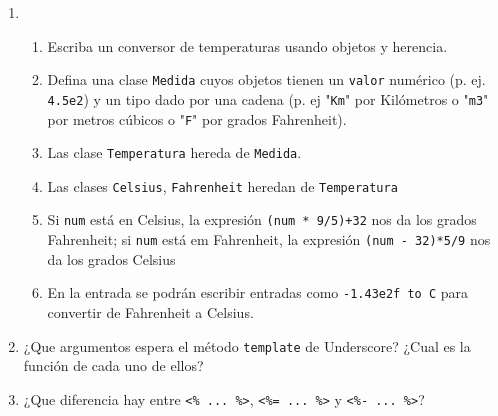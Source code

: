 \documentclass[spanish,a4paper,11pt]{article}
\begin{document}
\begin{enumerate}



\item 
\begin{enumerate}
\item  Escriba un conversor de temperaturas
usando objetos y herencia.
\item  Defina una clase \verb|Medida| cuyos objetos tienen un \verb|valor| numérico (p.  ej. \verb|4.5e2|) y un tipo dado por una cadena (p. ej "\verb|Km|" por Kilómetros o "\verb|m3|" por metros cúbicos o "\verb|F|" por grados Fahrenheit).

\item  Las clase \verb|Temperatura| hereda de \verb|Medida|.
\item  Las clases \verb|Celsius|, \verb|Fahrenheit| heredan de \verb|Temperatura|
\item 
Si \verb|num| está en Celsius, la expresión \verb|(num * 9/5)+32| nos da los grados Fahrenheit; si \verb|num| 
está em Fahrenheit, la expresión  \verb|(num - 32)*5/9| nos da los grados Celsius
\item  En la entrada se podrán escribir entradas como \verb|-1.43e2f to C| para convertir de Fahrenheit a Celsius.
\end{enumerate}

\item  ¿Que argumentos espera el método \verb|template| de Underscore?
¿Cual es la función de cada uno de ellos?
\item 
¿Que diferencia hay entre \verb|<% ... %>|, \verb|<%= ... %>| y \verb|<%- ... %>|?



\end{enumerate}
\end{document}

